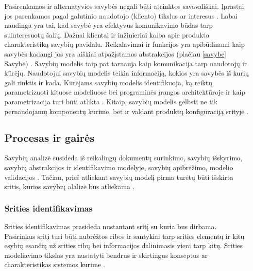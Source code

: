 \documentclass{VUMIFPSkursinis}
\begin{document}
Pasirenkamos ir alternatyvios savybės negali būti atrinktos savavališkai. Įprastai jos parenkamos pagal galutinio naudotojo (kliento) tikslus ar interesus \cite{Kang1990}. Labai naudinga yra tai, kad savybė yra efektyvus komunikavimo būdas tarp suinteresuotų šalių. Dažnai klientai ir inžinieriai kalba apie produkto charakteristiką savybių pavidalu. Reikalavimai ir funkcijos yra apibūdinami kaip savybės kadangi jos yra aiškiai atpažįstamos abstrakcijos (plačiau \ref{savybe} Savybė) \cite{Lee2015}. Savybių modelis taip pat tarnauja kaip komunikacija tarp naudotojų ir kūrėjų. Naudotojui savybių modelis teikia informaciją, kokios yra savybės iš kurių gali rinktis ir kada. Kūrėjams savybių modelis identifikuoja, ką reiktų parametrizuoti kituose modeliuose bei programinės įrangos architektūroje ir kaip parametrizacija turi būti atlikta \cite{Kang1990}. Kitaip, savybių modelis gelbsti ne tik pernaudojamų komponentų kūrime, bet ir valdant produktų konfigūraciją srityje \cite{Lee2015}.



\subsection{Procesas ir gairės} \label{procesas}

Savybių analizė susideda iš reikalingų dokumentų surinkimo, savybių išskyrimo, savybių abstrakcijos ir identifikavimo modelyje, savybių apibrėžimo, modelio validacijos \cite{Kang1990}. Tačiau, prieš atliekant savybių modelį pirma turėtų būti išskirta sritis, kurios savybių alalizė bus atliekama \cite{Lee2015}. 

\subsubsection{Srities identifikavimas}

Srities identifikavimas prasideda nustantant sritį su kuria bus dirbama. Pasirinkus sritį turi būti nubrėžtos ribos ir santykiai tarp srities elementų ir kitų esybių esančių už srities ribų bei informacijos dalinimasis vieni tarp kitų. Srities modeliavimo tikslas yra nustatyti bendrus ir skirtingus konseptus ar charakteristikas sistemos kūrime \cite{Lee2015}.  
\end{document}
